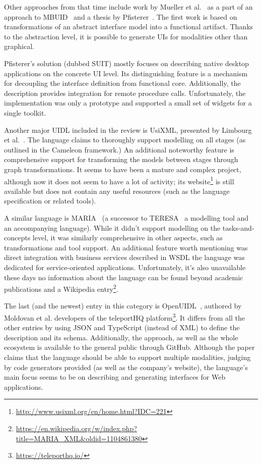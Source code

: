 Other approaches from that time include work by Mueller et al.~\cite{Mueller2001-un} as a part of an approach to MBUID~\cite{elwert1995Modelling} and a thesis by Pfisterer~\cite{pfistererSemantic2002}.
The first work is based on transformations of an abstract interface model into a functional artifact.
Thanks to the abstraction level, it is possible to generate UIs for modalities other than graphical.

Pfisterer's solution (dubbed SUIT) mostly focuses on describing native desktop applications on the concrete UI level.
Its distinguishing feature is a mechanism for decoupling the interface definition from functional core.
Additionally, the description provides integration for remote procedure calls.
Unfortunately, the implementation was only a prototype and supported a small set of widgets for a single toolkit.

Another major UIDL included in the review is UsiXML, presented by Limbourg et al.~\cite{limbourg2004usixml,limbourgusixml}.
The language claims to thoroughly support modelling on all stages (as outlined in the Cameleon framework.)
An additional noteworthy feature is comprehensive support for transforming the models between stages through graph transformations.
It seems to have been a mature and complex project, although now it does not seem to have a lot of activity;
its website\footnote{\url{http://www.usixml.org/en/home.html?IDC=221}} is still available but does not contain any useful resources (such as the language specification or related tools).

A similar language is MARIA~\cite{Paterno2009-nj} (a successor to TERESA~\cite{Mori2004-sr}\,\textemdash\,a modelling tool and an accompanying language).
While it didn't support modelling on the tasks-and-concepts level, it was similarly comprehensive in other aspects, such as transformations and tool support.
An additional feature worth mentioning was direct integration with business services described in WSDL\,\textemdash\,the language was dedicated for service-oriented applications.
Unfortunately, it's also unavailable these days\,\textemdash\,no information about the language can be found beyond academic publications and a Wikipedia entry\footnote{\url{https://en.wikipedia.org/w/index.php?title=MARIA_XML&oldid=1104861380}}.

The last (and the newest) entry in this category is OpenUIDL~\cite{moldovan2020open}, authored by Moldovan et al.\,\textemdash\,developers of the teleportHQ platform\footnote{\url{https://teleporthq.io/}}.
It differs from all the other entries by using JSON and TypeScript (instead of XML) to define the description and its schema.
Additionally, the approach, as well as the whole ecosystem is available to the general public through GitHub.
Although the paper claims that the language should be able to support multiple modalities, judging by code generators provided (as well as the company's website), the language's main focus seems to be on describing and generating interfaces for Web applications.

